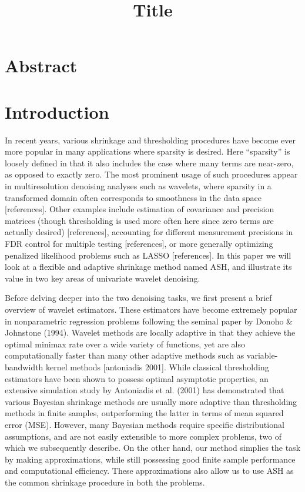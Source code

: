 \documentclass[12pt]{article}
\begin{document}
\title{\textbf{Title}}
\date{}
\maketitle

\section{Abstract}
\section{Introduction}
In recent years, various shrinkage and thresholding procedures have become ever more popular in many applications where sparsity is desired. Here ``sparsity'' is loosely defined in that it also includes the case where many terms are near-zero, as opposed to exactly zero. The most prominent usage of such procedures appear in multiresolution denoising analyses such as wavelets, where sparsity in a transformed domain often corresponds to smoothness in the data space [references]. Other examples include estimation of covariance and precision matrices (though thresholding is used more often here since zero terms are actually desired) [references], accounting for different measurement precisions in FDR control for multiple testing [references], or more generally optimizing penalized likelihood problems such as LASSO [references]. In this paper we will look at a flexible and adaptive shrinkage method named ASH, and illustrate its value in two key areas of univariate wavelet denoising.

Before delving deeper into the two denoising tasks, we first present a brief overview of wavelet estimators. These estimators have become extremely popular in nonparametric regression problems following the seminal paper by Donoho \& Johnstone (1994). Wavelet methods are locally adaptive in that they achieve the optimal minimax rate over a wide variety of functions, yet are also computationally faster than many other adaptive methods such as variable-bandwidth kernel methods [antoniadis 2001]. While classical thresholding estimators have been shown to possess optimal asymptotic properties, an extensive simulation study by Antoniadis et al. (2001) has demonstrated that various Bayesian shrinkage methods are usually more adaptive than thresholding methods in finite samples, outperforming the latter in terms of mean squared error (MSE). However, many Bayesian methods require specific distributional assumptions, and are not easily extensible to more complex problems, two of which we subsequently describe. On the other hand, our method simplies the task by making approximations, while still possessing good finite sample performance and computational efficiency. These approximations also allow us to use ASH as the common shrinkage procedure in both the problems.
\end{document}
